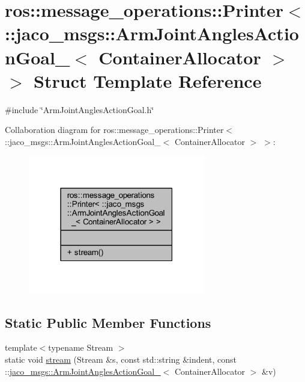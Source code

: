 \hypertarget{structros_1_1message__operations_1_1Printer_3_01_1_1jaco__msgs_1_1ArmJointAnglesActionGoal___3_01ContainerAllocator_01_4_01_4}{}\section{ros\+:\+:message\+\_\+operations\+:\+:Printer$<$ \+:\+:jaco\+\_\+msgs\+:\+:Arm\+Joint\+Angles\+Action\+Goal\+\_\+$<$ Container\+Allocator $>$ $>$ Struct Template Reference}
\label{structros_1_1message__operations_1_1Printer_3_01_1_1jaco__msgs_1_1ArmJointAnglesActionGoal___3_01ContainerAllocator_01_4_01_4}


{\ttfamily \#include \char`\"{}Arm\+Joint\+Angles\+Action\+Goal.\+h\char`\"{}}



Collaboration diagram for ros\+:\+:message\+\_\+operations\+:\+:Printer$<$ \+:\+:jaco\+\_\+msgs\+:\+:Arm\+Joint\+Angles\+Action\+Goal\+\_\+$<$ Container\+Allocator $>$ $>$\+:
\nopagebreak
\begin{figure}[H]
\begin{center}
\leavevmode
\includegraphics[width=219pt]{de/d17/structros_1_1message__operations_1_1Printer_3_01_1_1jaco__msgs_1_1ArmJointAnglesActionGoal___3_0c175f837d07aaabe0a424553e05912dc}
\end{center}
\end{figure}
\subsection*{Static Public Member Functions}
\begin{DoxyCompactItemize}
\item 
{\footnotesize template$<$typename Stream $>$ }\\static void \hyperlink{structros_1_1message__operations_1_1Printer_3_01_1_1jaco__msgs_1_1ArmJointAnglesActionGoal___3_01ContainerAllocator_01_4_01_4_a37b188ab33c040fc6fd932f366e7563e}{stream} (Stream \&s, const std\+::string \&indent, const \+::\hyperlink{structjaco__msgs_1_1ArmJointAnglesActionGoal__}{jaco\+\_\+msgs\+::\+Arm\+Joint\+Angles\+Action\+Goal\+\_\+}$<$ Container\+Allocator $>$ \&v)
\end{DoxyCompactItemize}



